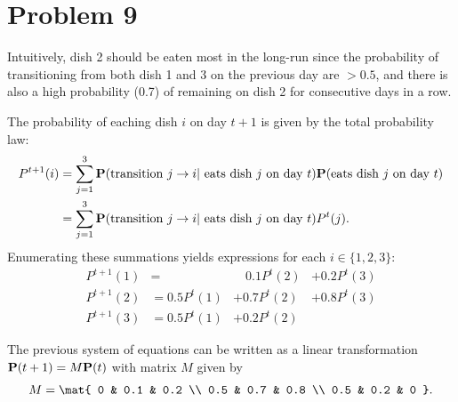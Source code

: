 \documentclass{homework}
\begin{document}
\section{Problem 9}
\begin{letterenum}
\item Intuitively, dish 2 should be eaten most in the long-run since the probability
of transitioning from both dish 1 and 3 on the previous day are $>0.5$, and there is also
a high probability (0.7) of remaining on dish 2 for consecutive days in a row.

\item The probability of eaching dish $i$ on day $t+1$ is given by the total probability
law:
\begin{align*}
    P^{t+1}(i) &= \sum_{j=1}^{3} {\bf P}(\text{transition } j \to i |
                                   \text{ eats dish }j \text{ on day }t)
                            {\bf P}(\text{eats dish }j \text{ on day }t) \\
        &= \sum_{j=1}^{3}{\bf P}(\text{transition } j \to i |
                                   \text{ eats dish }j \text{ on day }t)
            P^t(j).
\end{align*}
Enumerating these summations yields expressions for each $i\in\{1, 2, 3\}$:
\begin{equation*}
    \begin{array}{llll}
        P^{t+1}(1) &=            &\quad 0.1 P^t(2) &+ 0.2 P^t(3) \\
        P^{t+1}(2) &= 0.5 P^t(1) &+ 0.7 P^t(2) &+ 0.8 P^t(3) \\
        P^{t+1}(3) &= 0.5 P^t(1) &+ 0.2 P^t(2)
    \end{array}
\end{equation*}

\item The previous system of equations can be written as a linear transformation
${\bf P}(t+1) = M{\bf P}(t)$ with matrix $M$ given by
\begin{equation*}
    M = \mat{
        0 & 0.1 & 0.2 \\
        0.5 & 0.7 & 0.8 \\
        0.5 & 0.2 & 0
    }.
\end{equation*}

\end{letterenum}
\end{document}
